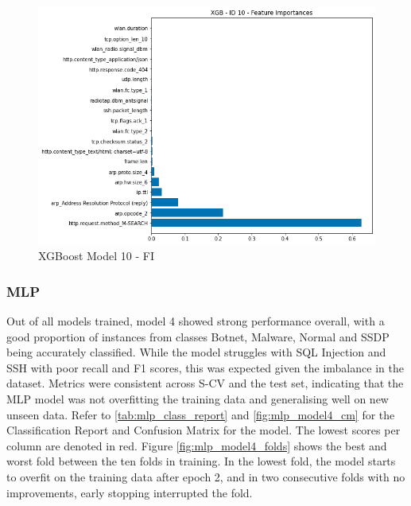 \begin{figure}[H]
	\centering
	\includegraphics[width=\textwidth]{Appendices/Images/XGB/Model10/XGB_Model10_FI.png}
	\caption{XGBoost Model 10 - FI}
  	\label{fig:xgb_model10_fi}
\end{figure}


\subsubsection*{MLP}

Out of all models trained, model 4 showed strong performance overall, with a good proportion of instances from classes Botnet, Malware, Normal and SSDP being accurately classified. While the model struggles with SQL Injection and SSH with poor recall and F1 scores, this was expected given the imbalance in the dataset. Metrics were consistent across S-CV and the test set, indicating that the MLP model was not overfitting the training data and generalising well on new unseen data. Refer to \ref{tab:mlp_class_report} and \ref{fig:mlp_model4_cm} for the Classification Report and Confusion Matrix for the model. The lowest scores per column are denoted in red. Figure \ref{fig:mlp_model4_folds} shows the best and worst fold between the ten folds in training. In the lowest fold, the model starts to overfit on the training data after epoch 2, and in two consecutive folds with no improvements, early stopping interrupted the fold.

